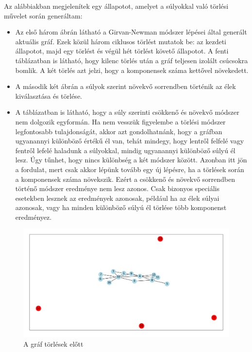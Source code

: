 Az alábbiakban megjelenítek egy állapotot, amelyet a súlyokkal való törlési művelet során generáltam:

\begin{itemize}
    \item  Az első három ábrán látható a Girvan-Newman módszer lépései által generált aktuális gráf. Ezek közül három ciklusos törlést mutatok be: az kezdeti állapotot, majd egy törlést és végül hét törlést követő állapotot. A fenti táblázatban is látható, hogy kilenc törlés után a gráf teljesen izolált csúcsokra bomlik. A két törlés azt jelzi, hogy a komponensek száma kettővel növekedett.
    \item  A második két ábrán a súlyok szerint növekvő sorrendben történik az élek kiválasztása és törlése.
    \item A táblázatban is látható, hogy a súly szerinti csökkenő és növekvő módszer nem dolgozik egyformán. Ha nem vesszük figyelembe a törlési módszer legfontosabb tulajdonságát, akkor azt gondolhatnánk, hogy a gráfban ugyanannyi különböző értékű él van, tehát mindegy, hogy lentről felfelé vagy fentről lefelé haladunk a súlyokkal, mindig ugyanannyi különböző súlyú él lesz. Úgy tűnhet, hogy nincs különbség a két módszer között. Azonban itt jön a fordulat, mert csak akkor lépünk tovább egy új lépésre, ha a törlések során a komponensek száma növekszik. Ezért a csökkenő és növekvő sorrendben történő módszer eredménye nem lesz azonos. Csak bizonyos speciális esetekben lesznek az eredmények azonosak, például ha az élek súlyai azonosak, vagy ha minden különböző súlyú él törlése több komponenst eredményez.      
\end{itemize}

\begin{figure}[h]
    \centering
    \includegraphics[scale=0.4]{images/girvan1lep}
    \caption{A gráf törlések előtt}
    \label{fig:enter-label}
\end{figure}


